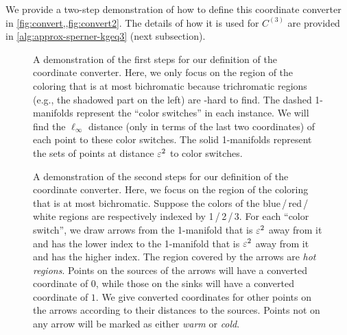 We provide a two-step demonstration of how to define this coordinate converter in \cref{fig:convert,,fig:convert2}.
The details of how it is used for $C^{(3)}$ are provided in \cref{alg:approx-sperner-kgeq3} (next subsection).

\begin{figure}[t]
    \centering
    
    \caption{\small A demonstration of the first steps for our definition of the coordinate converter. 
    Here, we only focus on the region of the coloring that is at most bichromatic because trichromatic regions (e.g., the shadowed part on the left) are \PPAD-hard to find.
    The dashed 1-manifolds represent the ``color switches'' in each instance. 
    We will find the $\ell_{\infty}$ distance (only in terms of the last two coordinates) of each point to these color switches. The solid 1-manifolds represent the sets of points at distance $\varepsilon^2$ to color switches.
    }
    \label{fig:convert}
\end{figure}

\begin{figure}[t]
    
    \caption{\small A demonstration of the second steps for our definition of the coordinate converter. 
    Here, we focus on the region of the coloring that is at most bichromatic.
    Suppose the colors of the blue\,/\,red\,/\,white regions are respectively indexed by 1\,/\,2\,/\,3. 
    For each ``color switch'', we draw arrows from the 1-manifold that is $\varepsilon^2$ away from it and has the lower index to the 1-manifold that is $\varepsilon^2$ away from it and has the higher index.
    The region covered by the arrows are {\em hot regions}.
    Points on the sources of the arrows will have a converted coordinate of $0$, while those on the sinks will have a converted coordinate of $1$.
    We give converted coordinates for other points on the arrows according to their distances to the sources. 
    Points not on any arrow will be marked as either {\em warm} or {\em cold}. 
    }
    \label{fig:convert2}
\end{figure}


